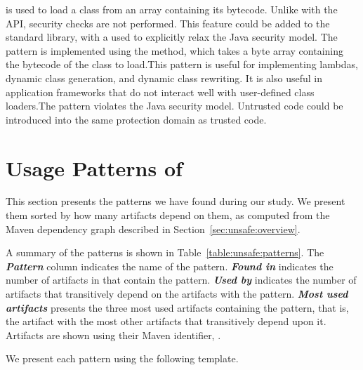%
{\smu{} is used to load a class from an array containing its bytecode. Unlike
with the  API, security checks are not performed.}
{This feature could be added to the standard library, with a
   used to explicitly relax the Java security model.}
{The pattern is implemented using the  method, which
takes a byte array containing the bytecode of the class to load.}{This pattern is useful for implementing lambdas, dynamic
class generation, and dynamic class rewriting. It is also useful in application
frameworks that do not interact well with user-defined class loaders.}{The
pattern violates the Java security model. Untrusted code could be introduced
into the same protection domain as trusted code.}

\section{Usage Patterns of \smu{}}
\label{sec:unsafe:patterns}

This section presents the patterns we have found during our study.
We present them sorted by how many artifacts depend on them, as computed from
the Maven dependency graph described in Section~\ref{sec:unsafe:overview}.

A summary of the patterns is shown in Table~\ref{table:unsafe:patterns}.
The \textbf{\em Pattern} column indicates the name of the pattern.
\textbf{\em Found in}
indicates the number of artifacts in \mavencentral{} that contain the pattern.
\textbf{\em Used by}
indicates the number of artifacts that transitively depend on the artifacts with the
pattern.
\textbf{\em Most used artifacts}
presents the three most used artifacts containing the pattern, that is, the 
artifact with the most other artifacts that transitively depend upon it.
Artifacts are shown using their Maven identifier, \ie{}
.



We present each pattern using the following template.
\medskip

